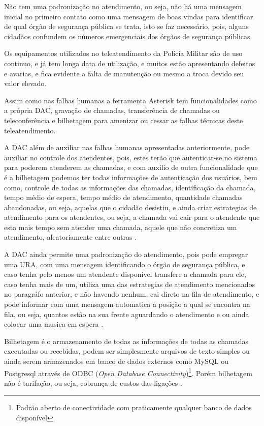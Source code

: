 Não tem uma padronização no atendimento, ou seja, não há uma mensagem inicial no primeiro contato como uma mensagem de boas vindas para identificar de qual órgão de segurança pública se trata, isto se faz necessário, pois, alguns cidadãos confundem os números emergenciais dos órgãos de segurança públicas.

Os equipamentos utilizados no teleatendimento da Polícia Militar são de uso continuo, e já tem longa data de utilização, e muitos estão apresentando defeitos e avarias, e fica evidente a falta de manutenção ou mesmo a troca devido seu valor elevado.

Assim como nas falhas humanas a ferramenta Asterisk tem funcionalidades como a própria DAC, gravação de chamadas, transferência de chamadas ou teleconferência e bilhetagem para amenizar ou cessar as falhas técnicas deste teleatendimento.

A DAC além de auxiliar nas falhas humanas apresentadas anteriormente, pode auxiliar no controle dos atendentes, pois, estes terão que autenticar-se no sistema para poderem atenderem as chamadas, e com auxilio de outra funcionalidade que é a bilhetagem podemos ter todas informações de autenticação dos usuários, bem como, controle de todas as informações das chamadas, identificação da chamada, tempo médio de espera, tempo médio de atendimento, quantidade chamadas abandonadas, ou seja, aquelas que o cidadão desistiu, e ainda criar estrategias de atendimento para os atendentes, ou seja, a chamada vai cair para o atendente que esta mais tempo sem atender uma chamada, aquele que não concretiza um atendimento, aleatoriamente entre outras \cite{books/daglib/0018909}.

A DAC ainda permite uma padronização do atendimento, pois pode empregar uma URA, com uma mensagem identificando o órgão de segurança pública, e caso tenha pelo menos um atendente disponível transfere a chamada para ele, caso tenha mais de um, utiliza uma das estrategias de atendimento mencionados no paragráfo anterior, e não havendo nenhum, cai direto na fila de atendimento, e pode informar com uma mensagem automatica a posição a qual se encontra na fila, ou seja, quantos estão na sua frente aguardando o atendimento e ou ainda colocar uma musica em espera \cite{flavioeduardoandredade2005}.

Bilhetagem é o armazenamento de todas as informações de todas as chamadas executadas ou recebidas, podem ser simplesmente arquivos de texto simples ou ainda serem armazenados em banco de dados externos como MySQL ou Postgresql através de ODBC (\textit{Open Database Connectivity})\footnote{Padrão aberto de conectividade com praticamente qualquer banco de dados disponível}. Porém bilhetagem não é tarifação, ou seja, cobrança de custos das ligações \cite{alexandrekeller2014}.

